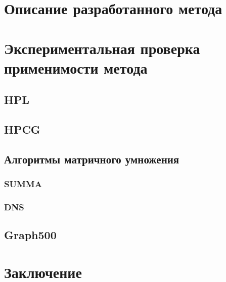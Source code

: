 \documentclass[unicode, t]{beamer}%
\begin{document}
\section{Описание разработанного метода}
\section{Экспериментальная проверка применимости метода}
	\subsection{HPL}
	\subsection{HPCG}
	\subsection{Алгоритмы матричного умножения}
		\subsubsection{SUMMA}
		\subsubsection{DNS}
	\subsection{Graph500}
\section{Заключение}
\end{document}
